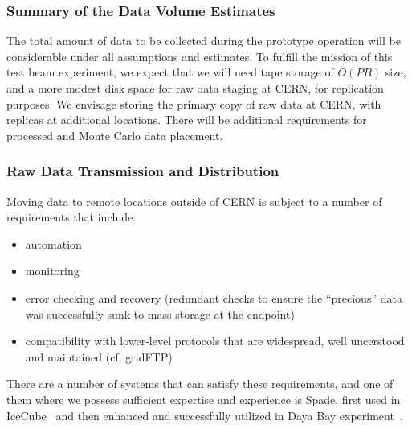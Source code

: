 
\subsubsection{Summary of the Data Volume Estimates}
The total amount of data to be collected during the prototype operation will be considerable under all assumptions and estimates.
To fulfill the mission of this test beam experiment, we expect that we will need tape storage of $O(PB)$ size,
and a more modest disk space for raw data staging at CERN, for replication purposes. We envisage storing the primary copy of raw data
at CERN, with replicas at additional locations. There will be additional requirements for processed and Monte Carlo data placement.


\subsubsection{Raw Data Transmission and Distribution}
Moving data to remote locations outside of CERN is subject to a number of requirements that include:
\begin{itemize}
\item automation
\item monitoring
\item error checking and recovery (redundant checks to ensure the ``precious'' data was successfully sunk to mass storage at the endpoint)
\item compatibility with lower-level protocols that are widespread, well uncerstood and maintained (cf. gridFTP)
\end{itemize}

There are a number of systems that can satisfy these requirements, and one of them where we possess sufficient expertise and experience is Spade, first used in IceCube~\cite{spade_icecube} and then enhanced and successfully utilized in Daya Bay experiment~\cite{spade_dayabay}.

